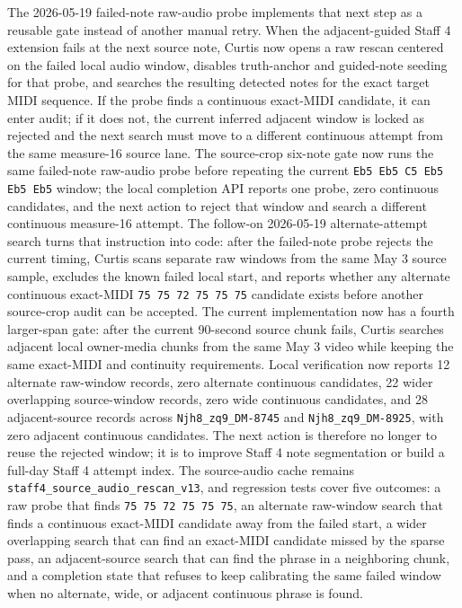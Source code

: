 The 2026-05-19 failed-note raw-audio probe implements that next step as a reusable gate instead of another manual retry. When the adjacent-guided Staff 4 extension fails at the next source note, Curtis now opens a raw rescan centered on the failed local audio window, disables truth-anchor and guided-note seeding for that probe, and searches the resulting detected notes for the exact target MIDI sequence. If the probe finds a continuous exact-MIDI candidate, it can enter audit; if it does not, the current inferred adjacent window is locked as rejected and the next search must move to a different continuous attempt from the same measure-16 source lane. The source-crop six-note gate now runs the same failed-note raw-audio probe before repeating the current \texttt{Eb5 Eb5 C5 Eb5 Eb5 Eb5} window; the local completion API reports one probe, zero continuous candidates, and the next action to reject that window and search a different continuous measure-16 attempt. The follow-on 2026-05-19 alternate-attempt search turns that instruction into code: after the failed-note probe rejects the current timing, Curtis scans separate raw windows from the same May 3 source sample, excludes the known failed local start, and reports whether any alternate continuous exact-MIDI \texttt{75 75 72 75 75 75} candidate exists before another source-crop audit can be accepted. The current implementation now has a fourth larger-span gate: after the current 90-second source chunk fails, Curtis searches adjacent local owner-media chunks from the same May 3 video while keeping the same exact-MIDI and continuity requirements. Local verification now reports 12 alternate raw-window records, zero alternate continuous candidates, 22 wider overlapping source-window records, zero wide continuous candidates, and 28 adjacent-source records across \texttt{Njh8\_zq9\_DM-8745} and \texttt{Njh8\_zq9\_DM-8925}, with zero adjacent continuous candidates. The next action is therefore no longer to reuse the rejected window; it is to improve Staff 4 note segmentation or build a full-day Staff 4 attempt index. The source-audio cache remains \texttt{staff4\_source\_audio\_rescan\_v13}, and regression tests cover five outcomes: a raw probe that finds \texttt{75 75 72 75 75 75}, an alternate raw-window search that finds a continuous exact-MIDI candidate away from the failed start, a wider overlapping search that can find an exact-MIDI candidate missed by the sparse pass, an adjacent-source search that can find the phrase in a neighboring chunk, and a completion state that refuses to keep calibrating the same failed window when no alternate, wide, or adjacent continuous phrase is found.

